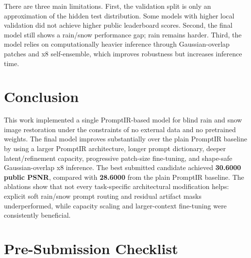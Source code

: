 \documentclass[10pt,conference]{article}
\begin{document}
There are three main limitations. First, the validation split is only an approximation of the hidden test distribution. Some models with higher local validation did not achieve higher public leaderboard scores. Second, the final model still shows a rain/snow performance gap; rain remains harder. Third, the model relies on computationally heavier inference through Gaussian-overlap patches and x8 self-ensemble, which improves robustness but increases inference time.

\section{Conclusion}

This work implemented a single PromptIR-based model for blind rain and snow image restoration under the constraints of no external data and no pretrained weights. The final model improves substantially over the plain PromptIR baseline by using a larger PromptIR architecture, longer prompt dictionary, deeper latent/refinement capacity, progressive patch-size fine-tuning, and shape-safe Gaussian-overlap x8 inference. The best submitted candidate achieved \textbf{30.6000 public PSNR}, compared with \textbf{28.6000} from the plain PromptIR baseline. The ablations show that not every task-specific architectural modification helps: explicit soft rain/snow prompt routing and residual artifact masks underperformed, while capacity scaling and larger-context fine-tuning were consistently beneficial.

\section*{Pre-Submission Checklist}
\end{document}
